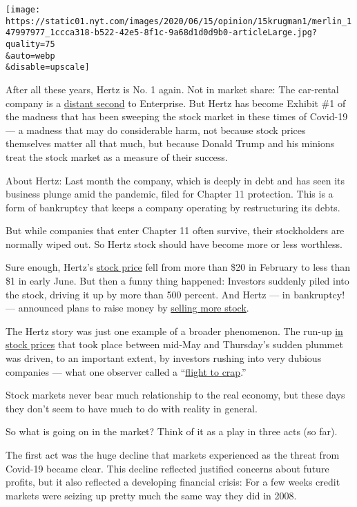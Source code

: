\texttt{[image: https://static01.nyt.com/images/2020/06/15/opinion/15krugman1/merlin\_147997977\_1ccca318-b522-42e5-8f1c-9a68d1d0d9b0-articleLarge.jpg?quality=75\\\&auto=webp\\\&disable=upscale]}

After all these years, Hertz is No. 1 again. Not in market share: The
car-rental company is a
\href{https://www.statista.com/statistics/1022011/car-rental-companies-market-share-united-states/}{distant
second} to Enterprise. But Hertz has become Exhibit \#1 of the madness
that has been sweeping the stock market in these times of Covid-19 --- a
madness that may do considerable harm, not because stock prices
themselves matter all that much, but because Donald Trump and his
minions treat the stock market as a measure of their success.

About Hertz: Last month the company, which is deeply in debt and has
seen its business plunge amid the pandemic, filed for Chapter 11
protection. This is a form of bankruptcy that keeps a company operating
by restructuring its debts.

But while companies that enter Chapter 11 often survive, their
stockholders are normally wiped out. So Hertz stock should have become
more or less worthless.

Sure enough, Hertz's \href{https://finance.yahoo.com/quote/HTZ/}{stock
price} fell from more than \$20 in February to less than \$1 in early
June. But then a funny thing happened: Investors suddenly piled into the
stock, driving it up by more than 500 percent. And Hertz --- in
bankruptcy! --- announced plans to raise money by
\href{https://www.marketwatch.com/story/hertz-seeks-bankruptcy-court-approval-to-offer-1-billion-in-stock-but-experts-expect-equity-to-be-wiped-out-2020-06-12}{selling
more stock}.

The Hertz story was just one example of a broader phenomenon. The run-up
\href{https://fred.stlouisfed.org/graph/fredgraph.png?g=rDaj}{in stock
prices} that took place between mid-May and Thursday's sudden plummet
was driven, to an important extent, by investors rushing into very
dubious companies --- what one observer called a
``\href{https://t.co/18VTGtR2rj?amp=1}{flight to crap}.''

Stock markets never bear much relationship to the real economy, but
these days they don't seem to have much to do with reality in general.

So what is going on in the market? Think of it as a play in three acts
(so far).

The first act was the huge decline that markets experienced as the
threat from Covid-19 became clear. This decline reflected justified
concerns about future profits, but it also reflected a developing
financial crisis: For a few weeks credit markets were seizing up pretty
much the same way they did in 2008.

